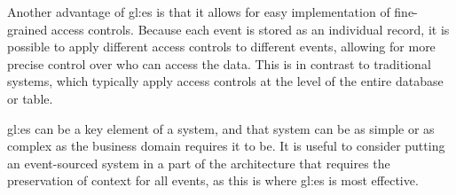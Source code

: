 Another advantage of \gls{gl:es} is that it allows for easy implementation of fine-grained access controls. Because each event is stored as an individual record, it is possible to apply different access controls to different events, allowing for more precise control over who can access the data. This is in contrast to traditional systems, which typically apply access controls at the level of the entire database or table.

\gls{gl:es} can be a key element of a system, and that system can be as simple or as complex as the business domain requires it to be. It is useful to consider putting an event-sourced system in a part of the architecture that requires the preservation of context for all events, as this is where \gls{gl:es} is most effective. 